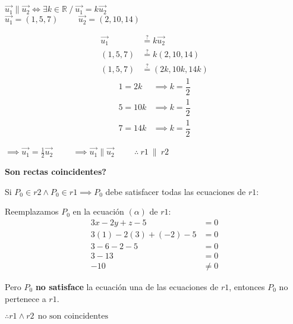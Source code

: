 \begin{center}
	$\vec{u_1} \parallel \vec{u_2} \iff \exists k \in \mathbb{R} \ / \ \vec{u_1} = k\vec{u_2}$ \\
	\vspace{0.3cm}
	$\vec{u_1} = (1, 5, 7) \hspace{1cm} \vec{u_2} = (2, 10, 14)$
\end{center}

\begin{multicols}{2}
	\begin{align*}
		\vec{u_1} & \overset{?}{=} k\vec{u_2}     \\
		(1, 5, 7) & \overset{?}{=} k(2, 10, 14)   \\
		(1, 5, 7) & \overset{?}{=} (2k, 10k, 14k)
	\end{align*}
	\columnbreak
	\begin{align*}
		1 = 2k  & \implies k = \dfrac{1}{2} \\
		5 = 10k & \implies k = \dfrac{1}{2} \\
		7 = 14k & \implies k = \dfrac{1}{2}
	\end{align*}
\end{multicols}
\begin{center}
	$\implies \vec{u_1} = \frac{1}{2}\vec{u_2} \hspace{1cm} \implies \vec{u_1} \parallel \vec{u_2} \hspace{1cm} \therefore \ \boxed{r1 \ \parallel \ r2}$
\end{center}

\vspace{1cm}
\noindent \textbf{Son rectas coincidentes?}

\noindent Si $P_0 \in r2 \land P_0 \in r1 \implies P_0$ debe satisfacer todas las ecuaciones de $r1$:

\noindent Reemplazamos $P_0$ en la ecuación $(\alpha)$ de $r1$:
\begin{align*}
	3x - 2y + z - 5        & = 0    \\
	3(1) - 2(3) + (-2) - 5 & = 0    \\
	3 - 6 -2 - 5           & = 0    \\
	3 - 13                 & = 0    \\
	-10                    & \neq 0
\end{align*}

\noindent Pero $P_0$ \textbf{no satisface} la ecuación una de las ecuaciones de $r1$, entonces $P_0$ no pertenece a $r1$.
\begin{center}
	$\therefore \boxed{r1 \land r2 \ \ \text{no son coincidentes}}$
\end{center}
